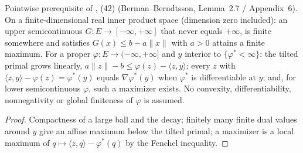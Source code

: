 \begin{lemma}
  \label{lem:legendre-attainment}
  \leanok
  Pointwise prerequisite of \cite{CorderoKlartag2015}, (42) (Berman--Berndtsson, Lemma~2.7 / Appendix~6).  On a
  finite-dimensional real inner product space (dimension zero included): an upper semicontinuous $G\colon E\to
  [-\infty,+\infty]$ that never equals $+\infty$, is finite somewhere and satisfies $G(x)\le b-a\|x\|$ with $a>0$ attains a finite
  maximum.  For a proper $\varphi\colon E\to(-\infty,+\infty]$ and $y$ interior to $\{\varphi^*<\infty\}$: the tilted primal grows
  linearly, $a\|z\|-b\le\varphi(z)-\langle z,y\rangle$; every $z$ with $\langle z,y\rangle-\varphi(z)=\varphi^*(y)$ equals
  $\nabla\varphi^*(y)$ when $\varphi^*$ is differentiable at $y$; and, for lower semicontinuous $\varphi$, such a maximizer
  exists.  No convexity, differentiability, nonnegativity or global finiteness of $\varphi$ is assumed.
\end{lemma}
\begin{proof}
  \leanok
  Compactness of a large ball and the decay; finitely many finite dual values around $y$ give an affine maximum below the
  tilted primal; a maximizer is a local maximum of $q\mapsto\langle z,q\rangle-\varphi^*(q)$ by the Fenchel inequality.
\end{proof}


